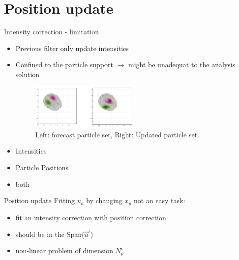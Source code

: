 \documentclass[aspectratio=169]{beamer} %
\begin{document}
\section{Position update}
\begin{frame}{Intensity correction - limitation}
    \begin{itemize}
        \item Previous filter only update intensities
        \item Confined to the particle support $\rightarrow$ might be unadequat to the analysis solution
              \begin{figure}
                  \centering
                  \includegraphics[width=0.5\textwidth]{images/unalign_discretization.png}
                  \caption{Left: forecast particle set, Right: Updated particle set.}
              \end{figure}
    \end{itemize}

    \begin{itemize}
        \item<2->Intensities
        \item<2-> \textcolor{ceared}{Particle Positions}
        \item<2-> both
    \end{itemize}
\end{frame}

\begin{frame}{Position update}
    Fitting $u_a$ by changing $x_p$ not an easy task:
    \begin{itemize}
        \item fit an intensity correction with position correction
        \item should be in the Span($\hat u^i$)
        \item non-linear problem of dimension $N_p^i$
    \end{itemize}
\end{frame}
\end{document}
